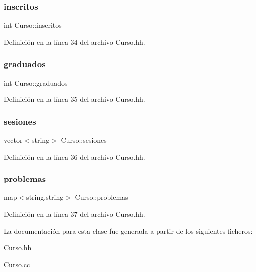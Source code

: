 \subsubsection{\texorpdfstring{inscritos}{inscritos}}
{\footnotesize\ttfamily int Curso\+::inscritos\hspace{0.3cm}{\ttfamily [private]}}



Definición en la línea 34 del archivo Curso.\+hh.

\mbox{\label{class_curso_abf52f538c449c083d4c067a3329c6af2}} 
\subsubsection{\texorpdfstring{graduados}{graduados}}
{\footnotesize\ttfamily int Curso\+::graduados\hspace{0.3cm}{\ttfamily [private]}}



Definición en la línea 35 del archivo Curso.\+hh.

\mbox{\label{class_curso_acd47bc8fe2f8121284246241d1e1dab5}} 
\subsubsection{\texorpdfstring{sesiones}{sesiones}}
{\footnotesize\ttfamily vector$<$string$>$ Curso\+::sesiones\hspace{0.3cm}{\ttfamily [private]}}



Definición en la línea 36 del archivo Curso.\+hh.

\mbox{\label{class_curso_a56b39dae4abfc058cf57956af639f1cb}} 
\subsubsection{\texorpdfstring{problemas}{problemas}}
{\footnotesize\ttfamily map$<$string,string$>$ Curso\+::problemas\hspace{0.3cm}{\ttfamily [private]}}



Definición en la línea 37 del archivo Curso.\+hh.



La documentación para esta clase fue generada a partir de los siguientes ficheros\+:\begin{DoxyCompactItemize}
\item 
\mbox{\hyperlink{_curso_8hh}{Curso.\+hh}}\item 
\mbox{\hyperlink{_curso_8cc}{Curso.\+cc}}\end{DoxyCompactItemize}
